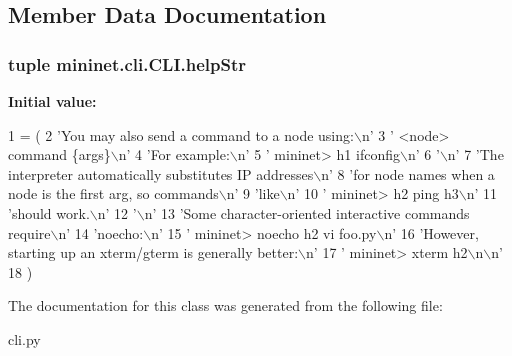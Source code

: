 \subsection{Member Data Documentation}
\hypertarget{classmininet_1_1cli_1_1CLI_aeb7cf364f155d2f9a583314441dfd577}{
\subsubsection[{help\-Str}]{\setlength{\rightskip}{0pt plus 5cm}tuple mininet.\-cli.\-C\-L\-I.\-help\-Str\hspace{0.3cm}{\ttfamily [static]}}}\label{classmininet_1_1cli_1_1CLI_aeb7cf364f155d2f9a583314441dfd577}
{\bfseries Initial value\-:}
\begin{DoxyCode}
1 = (
2         \textcolor{stringliteral}{'You may also send a command to a node using:\(\backslash\)n'}
3         \textcolor{stringliteral}{'  <node> command \{args\}\(\backslash\)n'}
4         \textcolor{stringliteral}{'For example:\(\backslash\)n'}
5         \textcolor{stringliteral}{'  mininet> h1 ifconfig\(\backslash\)n'}
6         \textcolor{stringliteral}{'\(\backslash\)n'}
7         \textcolor{stringliteral}{'The interpreter automatically substitutes IP addresses\(\backslash\)n'}
8         \textcolor{stringliteral}{'for node names when a node is the first arg, so commands\(\backslash\)n'}
9         \textcolor{stringliteral}{'like\(\backslash\)n'}
10         \textcolor{stringliteral}{'  mininet> h2 ping h3\(\backslash\)n'}
11         \textcolor{stringliteral}{'should work.\(\backslash\)n'}
12         \textcolor{stringliteral}{'\(\backslash\)n'}
13         \textcolor{stringliteral}{'Some character-oriented interactive commands require\(\backslash\)n'}
14         \textcolor{stringliteral}{'noecho:\(\backslash\)n'}
15         \textcolor{stringliteral}{'  mininet> noecho h2 vi foo.py\(\backslash\)n'}
16         \textcolor{stringliteral}{'However, starting up an xterm/gterm is generally better:\(\backslash\)n'}
17         \textcolor{stringliteral}{'  mininet> xterm h2\(\backslash\)n\(\backslash\)n'}
18     )
\end{DoxyCode}


The documentation for this class was generated from the following file\-:\begin{DoxyCompactItemize}
\item 
cli.\-py\end{DoxyCompactItemize}
